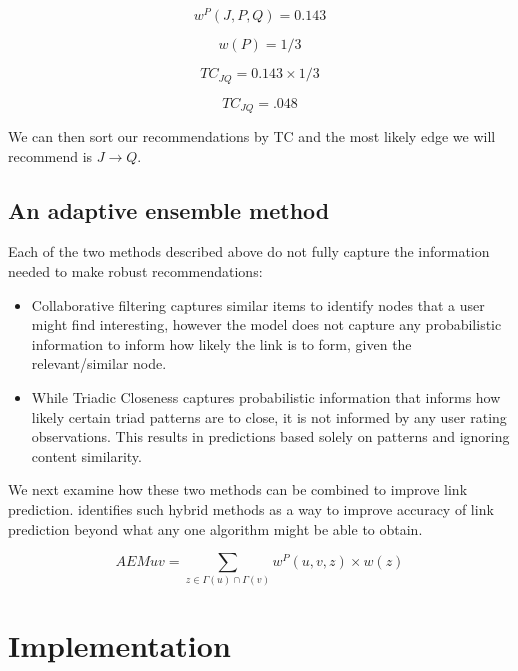 \begin{equation}
w^{P}(J,P,Q) = 0.143
\end{equation}

\begin{equation}
w(P)=1/3
\end{equation}

\begin{equation}
TC_{JQ} = 0.143 \times 1/3
\end{equation}

\begin{equation}
TC_{JQ} = .048
\end{equation}

We can then sort our recommendations by TC and the most likely edge we will recommend is $J \rightarrow Q$.

\subsection{An adaptive ensemble method}
Each of the two methods described above do not fully capture the information needed to make robust recommendations:
\begin{itemize}
\item Collaborative filtering captures similar items to identify nodes that a user might find interesting, however the model does not capture any probabilistic information to inform how likely the link is to form, given the relevant/similar node.
\item While Triadic Closeness captures probabilistic information that informs how likely certain triad patterns are to close, it is not informed by any user rating observations. This results in predictions based solely on patterns and ignoring content similarity.
\end{itemize}

We next examine how these two methods can be combined to improve link prediction. \cite{Lu2010} identifies such hybrid methods as a way to improve accuracy of link prediction beyond what any one algorithm might be able to obtain.


\begin{equation}
AEM{uv} = \sum_{z\in \Gamma(u)\cap \Gamma(v)} w^{P}(u, v, z) \times w(z)  
\end{equation}



\section{Implementation}


